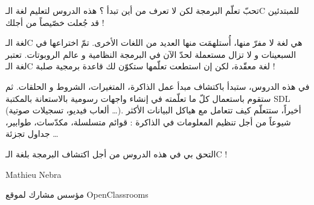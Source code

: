 \newpage
تحبّ تعلّم البرمجة لكن لا تعرف من أين تبدأ ؟ هذه الدروس لتعليم لغة الـ\textenglish{C}
للمبتدئين قد جُعلت خصّيصاً من أجلك !

لغة الـ\textenglish{C}
هي لغة لا مفرّ منها، أُستلهمَت منها العديد من اللغات الأخرى. تمّ اختراعها في السبعينات و لا تزال مستعملة لحدّ الآن في البرمجة النظامية و عالم الروبوتات. تعتبر لغة الـ\textenglish{C}
لغة معقّدة، لكن إن استطعت تعلّمها ستكوّن لك قاعدة برمجية صلبة !

في هذه الدروس، ستبدأ باكتشاف مبدأ عمل الذاكرة، المتغيرات، الشروط و الحلقات. ثم ستقوم باستعمال كلّ ما تعلّمته في إنشاء واجهات رسومية بالاستعانة بالمكتبة
\textenglish{SDL}
 (ألعاب فيديو، تسجيلات صوتية \dots). أخيراً، ستتعلّم كيف تتعامل مع هياكل البيانات الأكثر شيوعاً من أجل تنظيم المعلومات في الذاكرة : قوائم متسلسلة، مكدّسات، طوابير، جداول تجزئة \dots

التحق بي في هذه الدروس من أجل اكتشاف البرمجة بلغة الـ\textenglish{C} !


\vspace{3em}
\hfill \textenglish{Mathieu Nebra}

\hfill مؤسس مشارك لموقع \textenglish{OpenClassrooms}
